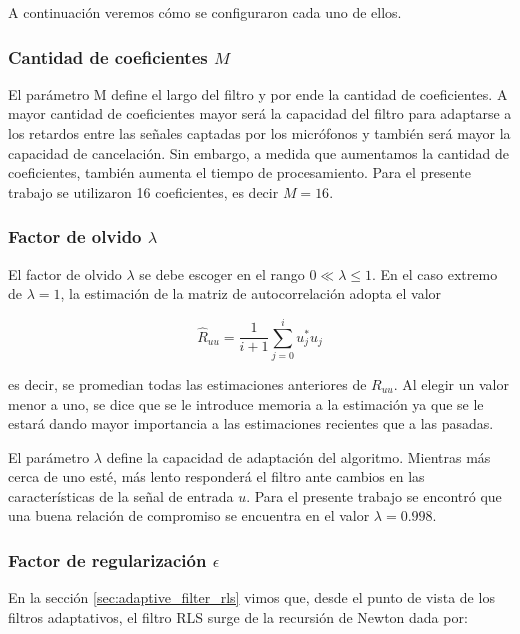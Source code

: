 A continuación veremos cómo se configuraron cada uno de ellos.

\subsubsection{Cantidad de coeficientes $M$}

El parámetro M define el largo del filtro y por ende la cantidad de coeficientes. A mayor cantidad de coeficientes mayor será la capacidad del filtro para adaptarse a los retardos entre las señales captadas por los micrófonos y también será mayor la capacidad de cancelación. Sin embargo, a medida que aumentamos la cantidad de coeficientes, también aumenta el tiempo de procesamiento. Para el presente trabajo se utilizaron 16 coeficientes, es decir $M=16$.

\subsubsection{Factor de olvido $\lambda$}

El factor de olvido $\lambda$ se debe escoger en el rango $0 \ll \lambda \le 1$. En el caso extremo de $\lambda=1$, la estimación de la matriz de autocorrelación adopta el valor

\begin{equation*}
	\hat{R}_{uu} = \frac{1}{i+1} \sum_{j=0}^{i} u_j^* u_j
\end{equation*}

\noindent es decir, se promedian todas las estimaciones anteriores de $R_{uu}$. Al elegir un valor menor a uno, se dice que se le introduce memoria a la estimación ya que se le estará dando mayor importancia a las estimaciones recientes que a las pasadas. 

El parámetro $\lambda$ define la capacidad de adaptación del algoritmo. Mientras más cerca de uno esté, más lento responderá el filtro ante cambios en las características de la señal de entrada $u$. Para el presente trabajo se encontró que una buena relación de compromiso se encuentra en el valor $\lambda=0.998$.

\subsubsection{Factor de regularización $\epsilon$}

En la sección \ref{sec:adaptive_filter_rls} vimos que, desde el punto de vista de los filtros adaptativos, el filtro RLS surge de la recursión de Newton dada por:


